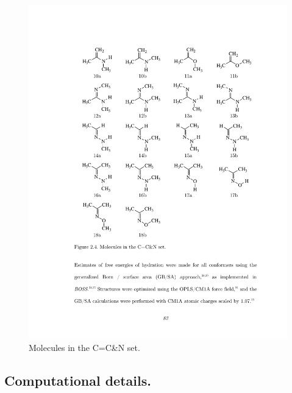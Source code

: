 \documentclass[12pt]{report}
\begin{document}
\begin{figure}[ht]
\centering
\includegraphics[scale=0.87]{figures/pdf/ccnset.pdf}
\caption{Molecules in the C=C\&N set.}
\label{ccn}
\end{figure}
\vspace*{0.2cm}


\subsection{Computational details.}
\end{document}
